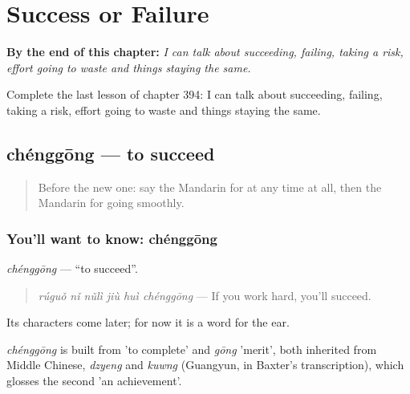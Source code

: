 
\chapter{Success or Failure}
\label{ch:zh-success-or-failure}

\begin{chapteropening}
\textbf{By the end of this chapter:} \emph{I can talk about succeeding, failing, taking a risk, effort going to waste and things staying the same.}

Complete the last lesson of chapter 394: I can talk about succeeding, failing, taking a risk, effort going to waste and things staying the same.
\end{chapteropening}

\section[chénggōng]{chénggōng — to succeed}

\label{lesson:ZH-C394-chenggong}



\begin{quote}
Before the new one: say the Mandarin for at any time at all, then the Mandarin for going smoothly.
\end{quote}

\subsection*{You'll want to know: chénggōng}
\emph{chénggōng} — \textquotedblleft{}to succeed\textquotedblright{}.

\begin{quote}
\emph{rúguǒ nǐ nǔlì jiù huì chénggōng} — If you work hard, you'll succeed.
\end{quote}

Its characters come later; for now it is a word for the ear.

\begin{cousinweb}
\emph{chénggōng} is built from  'to complete' and \emph{gōng} 'merit', both inherited from Middle Chinese, \emph{dzyeng} and \emph{kuwng} (Guangyun, in Baxter's transcription), which glosses the second 'an achievement'.
\end{cousinweb}


